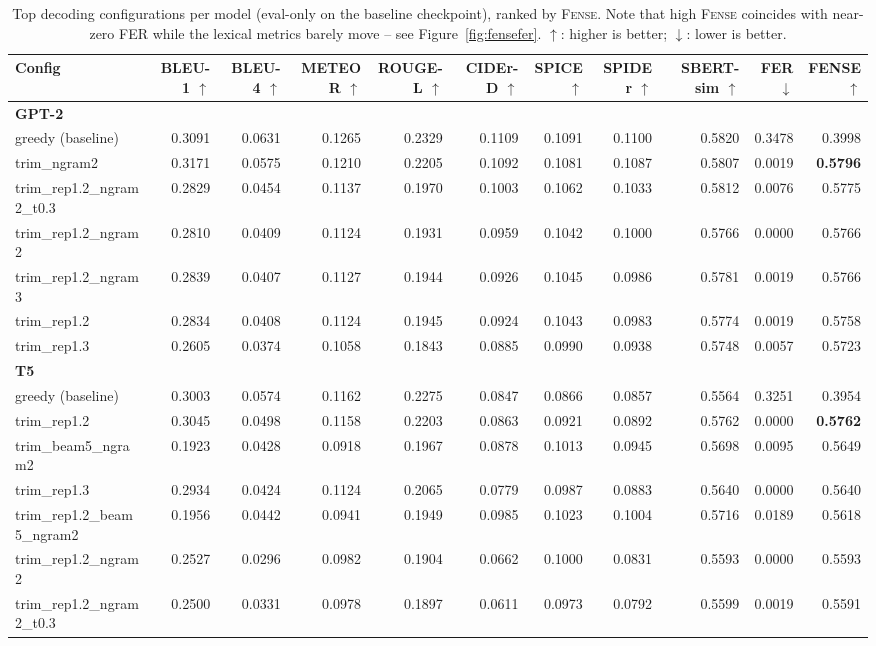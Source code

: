 \begin{table}[t]
\centering
\caption{Top decoding configurations per model (eval-only on the baseline checkpoint), ranked by \textsc{Fense}. Note that high \textsc{Fense} coincides with near-zero FER while the lexical metrics barely move -- see Figure~\ref{fig:fensefer}. $\uparrow$: higher is better; $\downarrow$: lower is better.}
\label{tab:decoding}
\footnotesize
\setlength{\tabcolsep}{4pt}
\begin{tabular}{lrrrrrrrrrr}
\toprule
Config & BLEU-1 $\uparrow$ & BLEU-4 $\uparrow$ & METEOR $\uparrow$ & ROUGE-L $\uparrow$ & CIDEr-D $\uparrow$ & SPICE $\uparrow$ & SPIDEr $\uparrow$ & SBERT-sim $\uparrow$ & FER $\downarrow$ & FENSE $\uparrow$ \\
\midrule
\multicolumn{11}{l}{\textbf{GPT-2}} \\
greedy (baseline) & 0.3091 & 0.0631 & 0.1265 & 0.2329 & 0.1109 & 0.1091 & 0.1100 & 0.5820 & 0.3478 & 0.3998 \\
trim\_ngram2 & 0.3171 & 0.0575 & 0.1210 & 0.2205 & 0.1092 & 0.1081 & 0.1087 & 0.5807 & 0.0019 & \textbf{0.5796} \\
trim\_rep1.2\_ngram2\_t0.3 & 0.2829 & 0.0454 & 0.1137 & 0.1970 & 0.1003 & 0.1062 & 0.1033 & 0.5812 & 0.0076 & 0.5775 \\
trim\_rep1.2\_ngram2 & 0.2810 & 0.0409 & 0.1124 & 0.1931 & 0.0959 & 0.1042 & 0.1000 & 0.5766 & 0.0000 & 0.5766 \\
trim\_rep1.2\_ngram3 & 0.2839 & 0.0407 & 0.1127 & 0.1944 & 0.0926 & 0.1045 & 0.0986 & 0.5781 & 0.0019 & 0.5766 \\
trim\_rep1.2 & 0.2834 & 0.0408 & 0.1124 & 0.1945 & 0.0924 & 0.1043 & 0.0983 & 0.5774 & 0.0019 & 0.5758 \\
trim\_rep1.3 & 0.2605 & 0.0374 & 0.1058 & 0.1843 & 0.0885 & 0.0990 & 0.0938 & 0.5748 & 0.0057 & 0.5723 \\
\midrule
\multicolumn{11}{l}{\textbf{T5}} \\
greedy (baseline) & 0.3003 & 0.0574 & 0.1162 & 0.2275 & 0.0847 & 0.0866 & 0.0857 & 0.5564 & 0.3251 & 0.3954 \\
trim\_rep1.2 & 0.3045 & 0.0498 & 0.1158 & 0.2203 & 0.0863 & 0.0921 & 0.0892 & 0.5762 & 0.0000 & \textbf{0.5762} \\
trim\_beam5\_ngram2 & 0.1923 & 0.0428 & 0.0918 & 0.1967 & 0.0878 & 0.1013 & 0.0945 & 0.5698 & 0.0095 & 0.5649 \\
trim\_rep1.3 & 0.2934 & 0.0424 & 0.1124 & 0.2065 & 0.0779 & 0.0987 & 0.0883 & 0.5640 & 0.0000 & 0.5640 \\
trim\_rep1.2\_beam5\_ngram2 & 0.1956 & 0.0442 & 0.0941 & 0.1949 & 0.0985 & 0.1023 & 0.1004 & 0.5716 & 0.0189 & 0.5618 \\
trim\_rep1.2\_ngram2 & 0.2527 & 0.0296 & 0.0982 & 0.1904 & 0.0662 & 0.1000 & 0.0831 & 0.5593 & 0.0000 & 0.5593 \\
trim\_rep1.2\_ngram2\_t0.3 & 0.2500 & 0.0331 & 0.0978 & 0.1897 & 0.0611 & 0.0973 & 0.0792 & 0.5599 & 0.0019 & 0.5591 \\
\bottomrule
\end{tabular}
\end{table}
